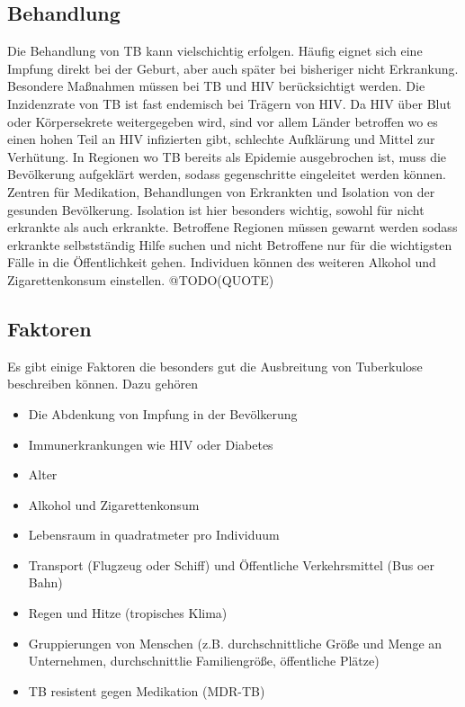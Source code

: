 \documentclass[paper=a4, fontsize=11pt, ngerman, abstract=on]{scrartcl}
\numberwithin{equation}{section} %
\numberwithin{figure}{section} %
\numberwithin{table}{section} %
\begin{document}
\subsection{Behandlung}

Die Behandlung von TB kann vielschichtig erfolgen. Häufig eignet sich eine Impfung direkt bei der Geburt, aber auch später bei bisheriger nicht Erkrankung. Besondere Maßnahmen müssen bei TB und HIV berücksichtigt werden. Die Inzidenzrate von TB ist fast endemisch bei Trägern von HIV. Da HIV über Blut oder Körpersekrete weitergegeben wird, sind vor allem Länder betroffen wo es einen hohen Teil an HIV infizierten gibt, schlechte Aufklärung und Mittel zur Verhütung. In Regionen wo TB bereits als Epidemie ausgebrochen ist, muss die Bevölkerung aufgeklärt werden, sodass gegenschritte eingeleitet werden können. Zentren für Medikation, Behandlungen von Erkrankten und Isolation von der gesunden Bevölkerung. Isolation ist hier besonders wichtig, sowohl für nicht erkrankte als auch erkrankte. Betroffene Regionen müssen gewarnt werden sodass erkrankte selbstständig Hilfe suchen und nicht Betroffene nur für die wichtigsten Fälle in die Öffentlichkeit gehen. Individuen können des weiteren Alkohol und Zigarettenkonsum einstellen. @TODO(QUOTE)

\subsection{Faktoren}

Es gibt einige Faktoren die besonders gut die Ausbreitung von Tuberkulose beschreiben können. Dazu gehören

\begin{itemize}
  \item Die Abdenkung von Impfung in der Bevölkerung
  \item Immunerkrankungen wie HIV oder Diabetes
  \item Alter
  \item Alkohol und Zigarettenkonsum
  \item Lebensraum in quadratmeter pro Individuum
  \item Transport (Flugzeug oder Schiff) und Öffentliche Verkehrsmittel (Bus oer Bahn)
  \item Regen und Hitze (tropisches Klima)
  \item Gruppierungen von Menschen (z.B. durchschnittliche Größe und Menge an Unternehmen, durchschnittlie Familiengröße, öffentliche Plätze)
  \item TB resistent gegen Medikation (MDR-TB)
\end{itemize}
\end{document}
